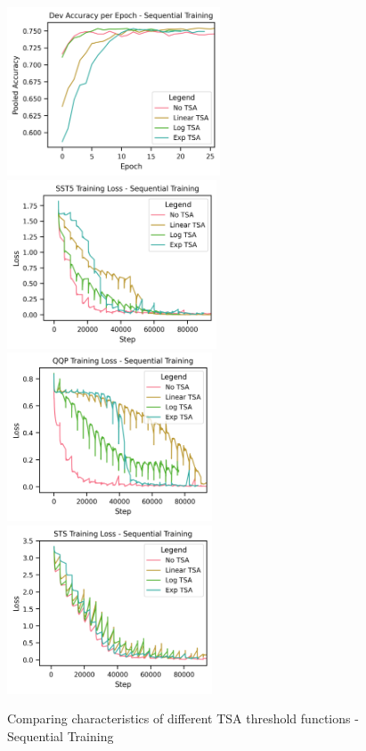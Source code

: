 \documentclass{article}
\begin{document}
\begin{figure}%
  \centering
  \subfloat
  {{\includegraphics[height=5cm]{pics/tsa-sequential-dev.png} }}%
  \qquad
  \subfloat
  {{\includegraphics[height=5cm]{pics/tsa-seq-sst-loss.png} }}%
  \qquad
  \subfloat
  {{\includegraphics[height=5cm]{pics/tsa-seq-qqp-loss.png} }}%
  \qquad
  \subfloat
  {{\includegraphics[height=5cm]{pics/tsa-seq-sts-loss.png} }}%
  \caption{Comparing characteristics of different TSA threshold functions - 
  Sequential Training}%
  \label{fig:tsa}%
\end{figure}
\end{document}
